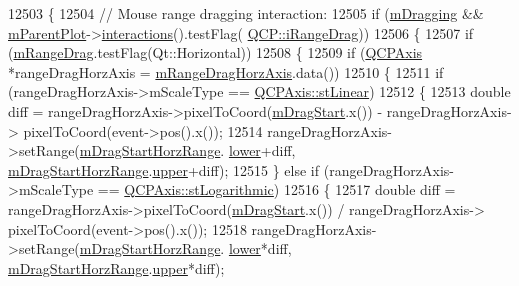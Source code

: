 \begin{DoxyCode}
12503 \{
12504   \textcolor{comment}{// Mouse range dragging interaction:}
12505   \textcolor{keywordflow}{if} (\hyperlink{class_q_c_p_axis_rect_ab49a6698194cf0e9e38a1d734c0888a8}{mDragging} && \hyperlink{class_q_c_p_layerable_aa2a528433e44db02b8aef23c1f9f90ed}{mParentPlot}->\hyperlink{class_q_custom_plot_a12401c02b6949a717f5749bb28c62983}{interactions}().testFlag(
      \hyperlink{namespace_q_c_p_a2ad6bb6281c7c2d593d4277b44c2b037a2c4432b9aceafb94000be8d1b589ef18}{QCP::iRangeDrag}))
12506   \{
12507     \textcolor{keywordflow}{if} (\hyperlink{class_q_c_p_axis_rect_aa9f107f66ca3469ad50ee6cea7c9e237}{mRangeDrag}.testFlag(Qt::Horizontal))
12508     \{
12509       \textcolor{keywordflow}{if} (\hyperlink{class_q_c_p_axis}{QCPAxis} *rangeDragHorzAxis = \hyperlink{class_q_c_p_axis_rect_aeaaa38c6d2030dd5f84461e2596e41e3}{mRangeDragHorzAxis}.data())
12510       \{
12511         \textcolor{keywordflow}{if} (rangeDragHorzAxis->mScaleType == \hyperlink{class_q_c_p_axis_a36d8e8658dbaa179bf2aeb973db2d6f0aff6e30a11a828bc850caffab0ff994f6}{QCPAxis::stLinear})
12512         \{
12513           \textcolor{keywordtype}{double} diff = rangeDragHorzAxis->pixelToCoord(\hyperlink{class_q_c_p_axis_rect_a032896b28f83a58010d8d533b78c49df}{mDragStart}.x()) - rangeDragHorzAxis->
      pixelToCoord(event->pos().x());
12514           rangeDragHorzAxis->setRange(\hyperlink{class_q_c_p_axis_rect_a41936cf473ec638bec382f5a40cdb1f3}{mDragStartHorzRange}.
      \hyperlink{class_q_c_p_range_aa3aca3edb14f7ca0c85d912647b91745}{lower}+diff, \hyperlink{class_q_c_p_axis_rect_a41936cf473ec638bec382f5a40cdb1f3}{mDragStartHorzRange}.\hyperlink{class_q_c_p_range_ae44eb3aafe1d0e2ed34b499b6d2e074f}{upper}+diff);
12515         \} \textcolor{keywordflow}{else} \textcolor{keywordflow}{if} (rangeDragHorzAxis->mScaleType == \hyperlink{class_q_c_p_axis_a36d8e8658dbaa179bf2aeb973db2d6f0abf5b785ad976618816dc6f79b73216d4}{QCPAxis::stLogarithmic})
12516         \{
12517           \textcolor{keywordtype}{double} diff = rangeDragHorzAxis->pixelToCoord(\hyperlink{class_q_c_p_axis_rect_a032896b28f83a58010d8d533b78c49df}{mDragStart}.x()) / rangeDragHorzAxis->
      pixelToCoord(event->pos().x());
12518           rangeDragHorzAxis->setRange(\hyperlink{class_q_c_p_axis_rect_a41936cf473ec638bec382f5a40cdb1f3}{mDragStartHorzRange}.
      \hyperlink{class_q_c_p_range_aa3aca3edb14f7ca0c85d912647b91745}{lower}*diff, \hyperlink{class_q_c_p_axis_rect_a41936cf473ec638bec382f5a40cdb1f3}{mDragStartHorzRange}.\hyperlink{class_q_c_p_range_ae44eb3aafe1d0e2ed34b499b6d2e074f}{upper}*diff);

\end{DoxyCode}

